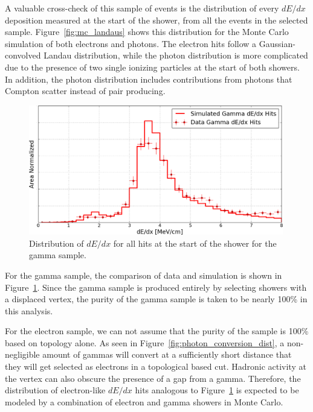 A valuable cross-check of this sample of events is the distribution of every $dE/dx$ deposition measured at the start of the shower, from all the events in the selected sample.  Figure~\ref{fig:mc_landaus} shows this distribution for the Monte Carlo simulation of both electrons and photons.  The electron hits follow a Gaussian-convolved Landau distribution, while the photon distribution is more complicated due to the presence of two single ionizing particles at the start of both showers.  In addition, the photon distribution includes contributions from photons that Compton scatter instead of pair producing.

\begin{figure}[htb]
  \centering
  \includegraphics[width=0.99\textwidth]{emshower_figures/photons_landau_trimmed.png}
  \caption[Photon Landau Distribution]{Distribution of $dE/dx$ for all hits at the start of the shower for the gamma sample.}
  \label{fig:photon_landau}
 \end{figure} 

For the gamma sample, the comparison of data and simulation is shown in Figure~\ref{fig:photon_landau}.  Since the gamma sample is produced entirely by selecting showers with a displaced vertex, the purity of the gamma sample is 
taken to be nearly 100\% in this analysis.


For the electron sample, we can not assume that the purity of the sample is 100\% based on topology alone.  As seen in Figure~\ref{fig:photon_conversion_dist}, a non-negligible amount of gammas will convert at a sufficiently short distance that they will get selected as electrons in a topological based cut.  Hadronic activity at the vertex can also obscure the presence of a gap from a gamma.  Therefore, the distribution of electron-like $dE/dx$ hits analogous to Figure~\ref{fig:photon_landau} is expected to be modeled by a combination of electron and gamma showers in Monte Carlo.

